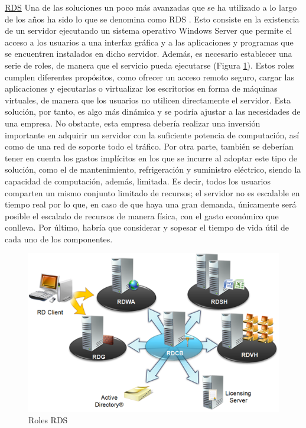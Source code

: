 \noindent\underline{\acf{RDS}}\newline
\indent Una de las soluciones un poco más avanzadas que se ha utilizado a lo largo de los años ha sido lo que se denomina como \acs{RDS} \cite{alejandroherreiz2017}. Esto consiste en la existencia de un servidor ejecutando un sistema operativo Windows Server que permite el acceso a los usuarios a una interfaz gráfica y a las aplicaciones y programas que se encuentren instalados en dicho servidor. Además, es necesario establecer una serie de roles, de manera que el servicio pueda ejecutarse (Figura \ref{fig:roles_rds}). Estos roles cumplen diferentes propósitos, como ofrecer un acceso remoto seguro, cargar las aplicaciones y ejecutarlas o virtualizar los escritorios en forma de máquinas virtuales, de manera que los usuarios no utilicen directamente el servidor. Esta solución, por tanto, es algo más dinámica y se podría ajustar a las necesidades de una empresa. No obstante, esta empresa debería realizar una inversión importante en adquirir un servidor con la suficiente potencia de computación, así como de una red de soporte todo el tráfico. Por otra parte, también se deberían tener en cuenta los gastos implícitos en los que se incurre al adoptar este tipo de solución, como el de mantenimiento, refrigeración y suministro eléctrico, siendo la capacidad de computación, además, limitada. Es decir, todos los usuarios comparten un mismo conjunto limitado de recursos; el servidor no es escalable en tiempo real por lo que, en caso de que haya una gran demanda, únicamente será posible el escalado de recursos de manera física, con el gasto económico que conlleva. Por último, habría que considerar y sopesar el tiempo de vida útil de cada uno de los componentes.

\begin{figure}[h]
    \centering
    \includegraphics[width=0.7\linewidth]{figures/images/RDS_roles.png}
    \caption{Roles \acs{RDS}}
    \label{fig:roles_rds}
\end{figure}

